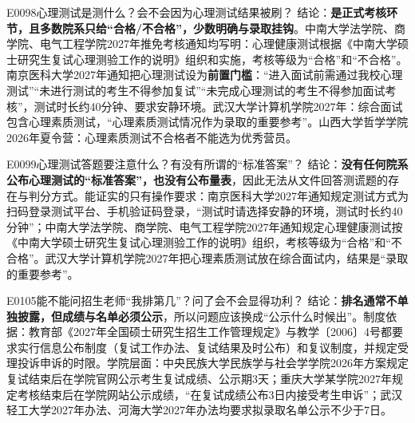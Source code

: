 \begin{qa}{E0098}{心理测试是测什么？会不会因为心理测试结果被刷？}
结论：\textbf{是正式考核环节，且多数院系只给“合格/不合格”，少数明确与录取挂钩}。中南大学法学院、商学院、电气工程学院2027年推免考核通知均写明：心理健康测试根据《中南大学硕士研究生复试心理测验工作的说明》组织和实施，考核等级为“合格”和“不合格”。南京医科大学2027年通知把心理测试设为\textbf{前置门槛}：“进入面试前需通过我校心理测试”“未进行测试的考生不得参加复试”“未完成心理测试的考生不得参加面试考核”，测试时长约40分钟、要求安静环境。武汉大学计算机学院2027年：综合面试包含心理素质测试，“心理素质测试情况作为录取的重要参考”。山西大学哲学学院2026年夏令营：心理素质测试不合格者不能选为优秀营员。
\end{qa}

\begin{qa}{E0099}{心理测试答题要注意什么？有没有所谓的“标准答案”？}
结论：\textbf{没有任何院系公布心理测试的“标准答案”，也没有公布量表}，因此无法从文件回答测谎题的存在与判分方式。能证实的只有操作要求：南京医科大学2027年通知规定测试方式为扫码登录测试平台、手机验证码登录，“测试时请选择安静的环境，测试时长约40分钟”；中南大学法学院、商学院、电气工程学院2027年通知规定心理健康测试按《中南大学硕士研究生复试心理测验工作的说明》组织，考核等级为“合格”和“不合格”。武汉大学计算机学院2027年把心理素质测试放在综合面试内，结果是“录取的重要参考”。
\end{qa}

\begin{qa}{E0105}{能不能问招生老师“我排第几”？问了会不会显得功利？}
结论：\textbf{排名通常不单独披露，但成绩与名单必须公示}，所以问题应该换成“公示什么时候出”。制度依据：教育部《2027年全国硕士研究生招生工作管理规定》与教学〔2006〕4号都要求实行信息公布制度（复试工作办法、复试结果及时公布）和复议制度，并规定受理投诉申诉的时限。学院层面：中央民族大学民族学与社会学学院2026年方案规定复试结束后在学院官网公示考生复试成绩、公示期3天；重庆大学某学院2027年规定考核结束后在学院网站公示成绩，“在复试成绩公布3日内接受考生申诉”；武汉轻工大学2027年办法、河海大学2027年办法均要求拟录取名单公示不少于7日。
\end{qa}

